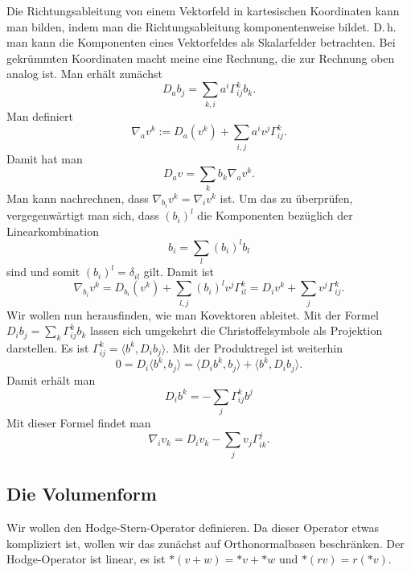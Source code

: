 \documentclass[a4paper,10pt,fleqn,twocolumn,twoside]{article}
\numberwithin{equation}{section}
\begin{document}
Die Richtungsableitung von einem Vektorfeld in kartesischen
Koordinaten kann man bilden, indem man die Richtungsableitung
komponentenweise bildet. D.\,h. man kann die Komponenten eines
Vektorfeldes als Skalarfelder betrachten. Bei gekrümmten Koordinaten
macht meine eine Rechnung, die zur Rechnung oben analog ist.
Man erhält zunächst
\begin{equation}
D_a b_j = \sum_{k,i}a^i \Gamma_{ij}^k b_k.
\end{equation}
Man definiert
\begin{equation}
\nabla_a v^k := D_a(v^k) + \sum_{i,j}a^i v^j \Gamma_{ij}^k.
\end{equation}
Damit hat man
\begin{equation}
D_a v = \sum_k b_k \nabla_a v^k.
\end{equation}
Man kann nachrechnen, dass $\nabla_{b_i}v^k=\nabla_i v^k$ ist.
Um das zu überprüfen, vergegenwärtigt man sich, dass $(b_i)^l$
die Komponenten bezüglich der Linearkombination 
\begin{equation}
b_i = \sum_{l} (b_i)^l b_l
\end{equation}
sind und somit $(b_i)^l=\delta_{il}$ gilt. Damit ist
\[\nabla_{b_i} v^k = D_{b_i}(v^k)
+ \sum_{l,j}(b_i)^l v^j \Gamma_{il}^k
= D_i v^k + \sum_{j} v^j\Gamma_{ij}^k.\]
Wir wollen nun herausfinden, wie man Kovektoren ableitet.
Mit der Formel $D_ib_j=\sum_k\Gamma_{ij}^k b_k$ lassen sich
umgekehrt die Christoffelsymbole als Projektion darstellen. Es ist
$\Gamma_{ij}^k = \langle b^k,D_ib_j\rangle.$
Mit der Produktregel ist weiterhin
\begin{equation}
0=D_i\langle b^k,b_j\rangle
= \langle D_ib^k,b_j\rangle + \langle b^k,D_ib_j\rangle.
\end{equation}
Damit erhält man
\begin{equation}
D_ib^k = -\sum_{j}\Gamma_{ij}^kb^j
\end{equation}
Mit dieser Formel findet man
\begin{equation}
\nabla_i v_k = D_iv_k-\sum_{j}v_j\Gamma_{ik}^j.
\end{equation}

\subsection{Die Volumenform}

Wir wollen den Hodge-Stern-Operator definieren. Da dieser Operator
etwas kompliziert ist, wollen wir das zunächst auf Orthonormalbasen
beschränken. Der Hodge-Operator ist linear, es ist
$*(v+w) = *v+*w$ und $*(rv)=r(*v)$.
\end{document}

